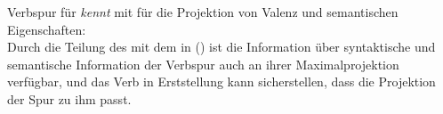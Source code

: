 \eas
\label{le-verbspur-kennt}%
Verbspur für \emph{kennt} mit \dslm für die Projektion von Valenz und semantischen Eigenschaften:\\
\samepage
{}
\zs
Durch die Teilung des \localwes mit dem \dslw in () ist die Information
über syntaktische und semantische Information der Verbspur auch an ihrer Maximalprojektion
verfügbar, und das Verb in Erststellung kann sicherstellen, dass die Projektion der Spur zu ihm passt.%

